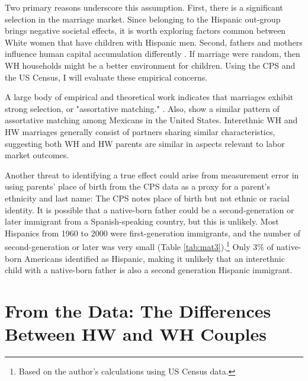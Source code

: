 Two primary reasons underscore this assumption. First, there is a significant selection in the marriage market. Since belonging to the Hispanic out-group brings negative societal effects, it is worth exploring factors common between White women that have children with Hispanic men. Second, fathers and mothers influence human capital accumulation differently \autocite{kimball2009risk,magruder2010intergenerational}. If marriage were random, then WH households might be a better environment for children. Using the CPS and the US Census, I will evaluate these empirical concerns.

A large body of empirical and theoretical work indicates that marriages exhibit strong selection, or "assortative matching." \autocite{averettBetterWorseRelationship2008, averettEconomicRealityBeauty1996, beckerTheoryMarriagePart1973, beckerTheoryMarriagePart1974, beckerTreatiseFamily1993, browningCollectiveUnitaryModels2006, chiapporiFatterAttractionAnthropometric2012}. Also, \textcite{duncanIntermarriageIntergenerationalTransmission2011} show a similar pattern of assortative matching among Mexicans in the United States. Interethnic WH and HW marriages generally consist of partners sharing similar characteristics, suggesting both WH and HW parents are similar in aspects relevant to labor market outcomes.

Another threat to identifying a true effect could arise from measurement error in using parents’ place of birth from the CPS data as a proxy for a parent’s ethnicity and last name: The CPS notes place of birth but not ethnic or racial identity. It is possible that a native-born father could be a second-generation or later immigrant from a Spanish-speaking country, but this is unlikely. Most Hispanics from 1960 to 2000  were first-generation immigrants, and the number of second-generation or later was very small (Table \ref{tab:mat3}).\footnote{Based on the author's calculations using US Census data.} Only 3\% of native-born Americans identified as Hispanic, making it unlikely that an interethnic child with a native-born father is also a second generation Hispanic immigrant. 

\section{From the Data: The Differences Between HW and WH Couples}\label{sec:hw-wh-couples-data}

